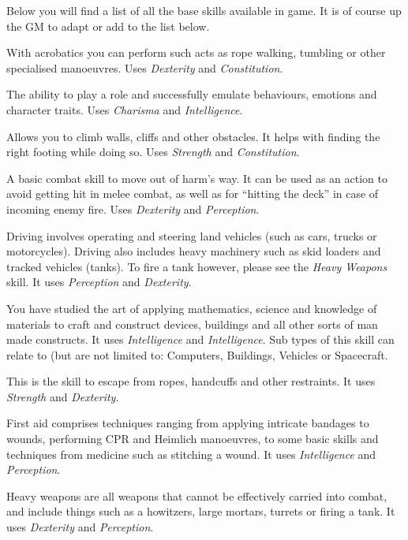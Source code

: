Below you will find a list of all the base skills available in game. It is of
course up the GM to adapt or add to the list below.

\begin{description}
   With acrobatics you can perform such acts as rope walking,
  tumbling or other specialised manoeuvres. Uses \emph{Dexterity} and  \emph{Constitution}.

   The ability to play a role and successfully emulate behaviours,
  emotions and character traits. Uses \emph{Charisma} and \emph{Intelligence}.

   Allows you to climb walls, cliffs and other obstacles. It helps with finding the right footing while doing so. Uses \emph{Strength} and
  \emph{Constitution}.

   A basic combat skill to move out of harm's way. It can be used
  as an action to avoid getting hit in melee combat, as well as for ``hitting the deck'' in case of incoming enemy fire. Uses \emph{Dexterity} and
  \emph{Perception}.

   Driving involves operating and steering land vehicles (such as
  cars, trucks or motorcycles). Driving also includes heavy machinery such as
  skid loaders and tracked vehicles (tanks). To fire a tank however, please see
  the \emph{Heavy Weapons} skill. It uses \emph{Perception} and \emph{Dexterity}.

   You have studied the art of applying
  mathematics, science and knowledge of materials to craft and construct
  devices, buildings and all other sorts of man made constructs. It uses
  \emph{Intelligence} and \emph{Intelligence}. Sub types of this skill can
  relate to (but are not limited to: Computers, Buildings, Vehicles or
  Spacecraft.

   This is the skill to escape from ropes, handcuffs and
  other restraints. It uses \emph{Strength} and \emph{Dexterity}.

   First aid comprises techniques ranging from applying
  intricate bandages to wounds, performing CPR and Heimlich manoeuvres, to some
  basic skills and techniques from medicine such as stitching a wound. It uses
  \emph{Intelligence} and \emph{Perception}.

   Heavy weapons are all weapons that cannot be effectively
  carried into combat, and include things such as a howitzers, large mortars,
  turrets or firing a tank. It uses \emph{Dexterity} and \emph{Perception}.


\end{description}
